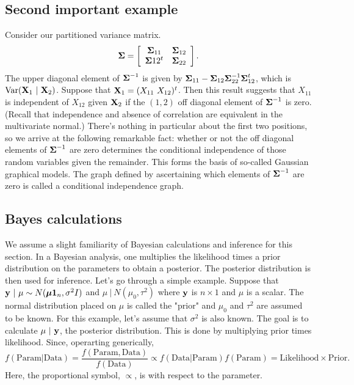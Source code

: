 \subsection{Second important example}
Consider our partitioned variance matrix. 
$$
\boldsymbol{\Sigma} = \left[
\begin{array}{cc}
\boldsymbol{\Sigma}_{11} & \boldsymbol{\Sigma}_{12} \\
\boldsymbol{\Sigma}{12}^t & \boldsymbol{\Sigma}_{22}
\end{array}
\right].
$$
The upper diagonal element of $\boldsymbol{\Sigma}^{-1}$ is given by  $\boldsymbol{\Sigma}_{11} - \boldsymbol{\Sigma}_{12} \boldsymbol{\Sigma}_{22}^{-1} \boldsymbol{\Sigma}_{12}^t$, which is $\mbox{Var}(\mathbf{X}_1 ~|~ \mathbf{X}_2)$. Suppose that
$\mathbf{X}_1 = (X_{11} ~ X_{12})^t$. Then this result suggests that
$X_{11}$ is independent of $X_{12}$ given $\mathbf{X}_2$ if the $(1,2)$ off diagonal element
of $\boldsymbol{\Sigma}^{-1}$ is zero. (Recall that independence and absence of correlation are
equivalent in the multivariate normal.) There's nothing in particular about the
first two positions, so we arrive at the following remarkable fact: whether or not
the off diagonal elements of $\boldsymbol{\Sigma}^{-1}$ are zero determines the conditional
independence of those random variables given the remainder. This forms the
basis of so-called Gaussian graphical models. The graph defined by ascertaining
which elements of $\boldsymbol{\Sigma}^{-1}$ are zero is called a conditional independence graph.



\subsection{Bayes calculations}
We assume a slight familiarity of Bayesian calculations and inference for this section.
In a Bayesian analysis, one multiplies the likelihood times a prior distribution
on the parameters to obtain a posterior. The posterior distribution is then used for
inference. Let's go through a simple example.
Suppose that $\mathbf{y} ~|~ \mu \sim N(\boldsymbol{\mu} \mathbf{1}_n, \sigma^2 I)$ and
$\mu ~|~ N(\mu_0, \tau^2)$ where $\mathbf{y}$ is $n \times 1$ and $\mu$ is a scalar. The
normal distribution placed on $\mu$ is called the "prior" and $\mu_0$ and $\tau^2$ 
are assumed to be known. For this example, let's assume that $\sigma^2$ is also
known. The goal is to calculate
$\mu ~|~ \mathbf{y}$, the posterior distribution. This is done by multiplying prior times
likelihood. Since, operarting generically,
$$
f(\mbox{Param} | \mbox{Data}) = \frac{f(\mbox{Param}, \mbox{Data})}{f(\mbox{Data})} 
\propto f(\mbox{Data} | \mbox{Param}) f(\mbox{Param}) = \mbox{Likelihood} \times \mbox{Prior}.
$$
Here, the proportional symbol, $\propto$, is with respect to the parameter.


